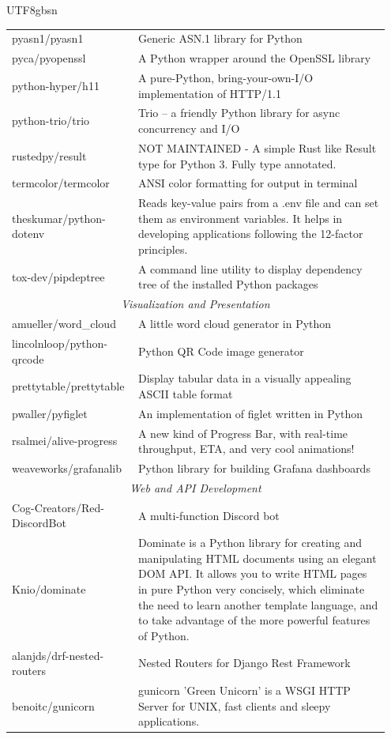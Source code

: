 \begin{CJK*}{UTF8}{gbsn}
\begin{longtable}{p{0.3\linewidth} | p{0.65\linewidth}}
pyasn1/pyasn1 & Generic ASN.1 library for Python \\
pyca/pyopenssl & A Python wrapper around the OpenSSL library \\
python-hyper/h11 & A pure-Python, bring-your-own-I/O implementation of HTTP/1.1 \\
python-trio/trio & Trio – a friendly Python library for async concurrency and I/O \\
rustedpy/result & NOT MAINTAINED - A simple Rust like Result type for Python 3. Fully type annotated. \\
termcolor/termcolor & ANSI color formatting for output in terminal \\
theskumar/python-dotenv & Reads key-value pairs from a .env file and can set them as environment variables. It helps in developing applications following the 12-factor principles. \\
tox-dev/pipdeptree & A command line utility to display dependency tree of the installed Python packages \\
\midrule
\multicolumn{2}{c}{\textit{Visualization and Presentation}} \\
\midrule
amueller/word\_cloud & A little word cloud generator in Python \\
lincolnloop/python-qrcode & Python QR Code image generator \\
prettytable/prettytable & Display tabular data in a visually appealing ASCII table format \\
pwaller/pyfiglet & An implementation of figlet written in Python \\
rsalmei/alive-progress & A new kind of Progress Bar, with real-time throughput, ETA, and very cool animations! \\
weaveworks/grafanalib & Python library for building Grafana dashboards \\
\midrule
\multicolumn{2}{c}{\textit{Web and API Development}} \\
\midrule
Cog-Creators/Red-DiscordBot & A multi-function Discord bot \\
Knio/dominate & Dominate is a Python library for creating and manipulating HTML documents using an elegant DOM API.  It allows you to write HTML pages in pure Python very concisely, which eliminate the need to learn another template language, and to take advantage of the more powerful features of Python. \\
alanjds/drf-nested-routers & Nested Routers for Django Rest Framework \\
benoitc/gunicorn & gunicorn 'Green Unicorn' is a WSGI HTTP Server for UNIX, fast clients and sleepy applications. \\

\end{longtable}
\end{CJK*}
